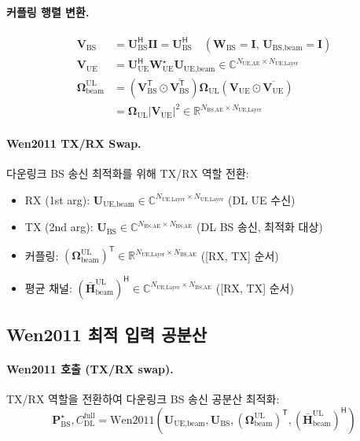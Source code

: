 \documentclass[10pt]{article}
\begin{document}
\paragraph{커플링 행렬 변환.}
\begin{align}
\mathbf{V}_{\text{BS}} &= \mathbf{U}_{\text{BS}}^{\mathsf{H}} \mathbf{I} \mathbf{I} = \mathbf{U}_{\text{BS}}^{\mathsf{H}} \quad (\text{$\mathbf{W}_{\text{BS}} = \mathbf{I}$, $\mathbf{U}_{\text{BS,beam}} = \mathbf{I}$}) \\
\mathbf{V}_{\text{UE}} &= \mathbf{U}_{\text{UE}}^{\mathsf{H}} \mathbf{W}_{\text{UE}}^{\star} \mathbf{U}_{\text{UE,beam}} \in \mathbb{C}^{N_{\text{UE,AE}} \times N_{\text{UE,Layer}}} \\
\boldsymbol{\Omega}_{\text{beam}}^{\text{UL}} &= (\mathbf{V}_{\text{BS}}^{\mathsf{T}} \odot \overline{\mathbf{V}_{\text{BS}}^{\mathsf{T}}}) \boldsymbol{\Omega}_{\text{UL}} (\mathbf{V}_{\text{UE}} \odot \overline{\mathbf{V}_{\text{UE}}}) \\
&= \boldsymbol{\Omega}_{\text{UL}} |\mathbf{V}_{\text{UE}}|^2 \in \mathbb{R}^{N_{\text{BS,AE}} \times N_{\text{UE,Layer}}}
\end{align}

\paragraph{Wen2011 TX/RX Swap.}
다운링크 BS 송신 최적화를 위해 TX/RX 역할 전환:
\begin{itemize}
    \item RX (1st arg): $\mathbf{U}_{\text{UE,beam}} \in \mathbb{C}^{N_{\text{UE,Layer}} \times N_{\text{UE,Layer}}}$ (DL UE 수신)
    \item TX (2nd arg): $\mathbf{U}_{\text{BS}} \in \mathbb{C}^{N_{\text{BS,AE}} \times N_{\text{BS,AE}}}$ (DL BS 송신, 최적화 대상)
    \item 커플링: $(\boldsymbol{\Omega}_{\text{beam}}^{\text{UL}})^{\mathsf{T}} \in \mathbb{R}^{N_{\text{UE,Layer}} \times N_{\text{BS,AE}}}$ ([RX, TX] 순서)
    \item 평균 채널: $(\bar{\mathbf{H}}_{\text{beam}}^{\text{UL}})^{\mathsf{H}} \in \mathbb{C}^{N_{\text{UE,Layer}} \times N_{\text{BS,AE}}}$ ([RX, TX] 순서)
\end{itemize}

\subsection{Wen2011 최적 입력 공분산}

\paragraph{Wen2011 호출 (TX/RX swap).}
TX/RX 역할을 전환하여 다운링크 BS 송신 공분산 최적화:
\begin{equation}
\mathbf{P}_{\text{BS}}^{\star}, C_{\text{DL}}^{\text{full}} = \text{Wen2011}\left(\mathbf{U}_{\text{UE,beam}}, \mathbf{U}_{\text{BS}}, (\boldsymbol{\Omega}_{\text{beam}}^{\text{UL}})^{\mathsf{T}}, (\bar{\mathbf{H}}_{\text{beam}}^{\text{UL}})^{\mathsf{H}}\right)
\end{equation}
\end{document}
